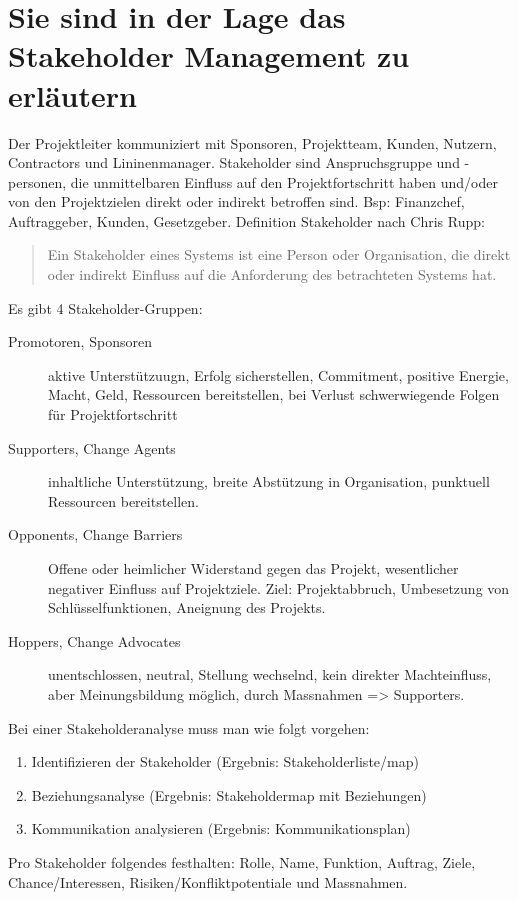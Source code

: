 \section{Sie sind in der Lage das Stakeholder Management zu erläutern}
Der Projektleiter kommuniziert mit Sponsoren, Projektteam, Kunden, Nutzern, Contractors und Lininenmanager. Stakeholder sind Anspruchsgruppe und -personen, die unmittelbaren Einfluss auf den Projektfortschritt haben und/oder von den Projektzielen direkt oder indirekt betroffen sind. Bsp: Finanzchef, Auftraggeber, Kunden, Gesetzgeber. Definition Stakeholder nach Chris Rupp: 
\begin{quote}
	Ein Stakeholder eines Systems ist eine Person oder Organisation, die direkt oder indirekt Einfluss auf die Anforderung des betrachteten Systems hat.
\end{quote}

Es gibt 4 Stakeholder-Gruppen:
\begin{description}
	\item [Promotoren, Sponsoren] aktive Unterstützuugn, Erfolg sicherstellen, Commitment, positive Energie, Macht, Geld, Ressourcen bereitstellen, bei Verlust schwerwiegende Folgen für Projektfortschritt
	\item [Supporters, Change Agents] inhaltliche Unterstützung, breite Abstützung in Organisation, punktuell Ressourcen bereitstellen.
	\item [Opponents, Change Barriers] Offene oder heimlicher Widerstand gegen das Projekt, wesentlicher negativer Einfluss auf Projektziele. Ziel: Projektabbruch, Umbesetzung von Schlüsselfunktionen, Aneignung des Projekts.
	\item [Hoppers, Change Advocates] unentschlossen, neutral, Stellung wechselnd, kein direkter Machteinfluss, aber Meinungsbildung möglich, durch Massnahmen => Supporters.
\end{description}

Bei einer Stakeholderanalyse muss man wie folgt vorgehen:
\begin{enumerate}
	\item Identifizieren der Stakeholder (Ergebnis: Stakeholderliste/map)
	\item Beziehungsanalyse (Ergebnis: Stakeholdermap mit Beziehungen)
	\item Kommunikation analysieren (Ergebnis: Kommunikationsplan)
\end{enumerate}
	
Pro Stakeholder folgendes festhalten: Rolle, Name, Funktion, Auftrag, Ziele, Chance/Interessen, Risiken/Konfliktpotentiale und Massnahmen.


